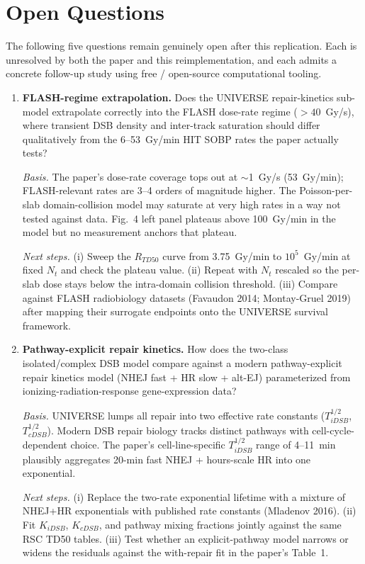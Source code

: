 \section{Open Questions}

The following five questions remain genuinely open after this replication.
Each is unresolved by both the paper and this reimplementation, and each
admits a concrete follow-up study using free / open-source computational
tooling.

\begin{enumerate}

\item \textbf{FLASH-regime extrapolation.}
Does the UNIVERSE repair-kinetics sub-model extrapolate correctly into the
FLASH dose-rate regime ($>40$~Gy/s), where transient DSB density and
inter-track saturation should differ qualitatively from the 6--53~Gy/min
HIT SOBP rates the paper actually tests?

\emph{Basis.} The paper's dose-rate coverage tops out at $\sim$1~Gy/s
(53~Gy/min); FLASH-relevant rates are 3--4 orders of magnitude higher. The
Poisson-per-slab domain-collision model may saturate at very high rates in a
way not tested against data. Fig.~4 left panel plateaus above 100~Gy/min in
the model but no measurement anchors that plateau.

\emph{Next steps.} (i) Sweep the $R_{TD50}$ curve from 3.75~Gy/min to
$10^{5}$~Gy/min at fixed $N_t$ and check the plateau value.
(ii) Repeat with $N_t$ rescaled so the per-slab dose stays below the
intra-domain collision threshold.
(iii) Compare against FLASH radiobiology datasets (Favaudon 2014;
Montay-Gruel 2019) after mapping their surrogate endpoints onto the
UNIVERSE survival framework.

\item \textbf{Pathway-explicit repair kinetics.}
How does the two-class isolated/complex DSB model compare against a modern
pathway-explicit repair kinetics model (NHEJ fast + HR slow + alt-EJ)
parameterized from ionizing-radiation-response gene-expression data?

\emph{Basis.} UNIVERSE lumps all repair into two effective rate constants
($T_{iDSB}^{1/2}$, $T_{cDSB}^{1/2}$). Modern DSB repair biology tracks
distinct pathways with cell-cycle-dependent choice. The paper's
cell-line-specific $T_{iDSB}^{1/2}$ range of 4--11~min plausibly aggregates
20-min fast NHEJ + hours-scale HR into one exponential.

\emph{Next steps.} (i) Replace the two-rate exponential lifetime with a
mixture of NHEJ+HR exponentials with published rate constants
(Mladenov 2016).
(ii) Fit $K_{iDSB}$, $K_{cDSB}$, and pathway mixing fractions jointly
against the same RSC TD50 tables.
(iii) Test whether an explicit-pathway model narrows or widens the
residuals against the with-repair fit in the paper's Table~1.


\end{enumerate}
